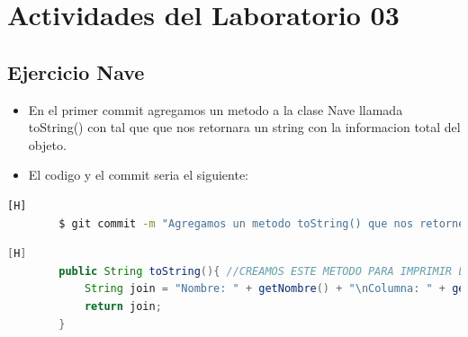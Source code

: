 \documentclass{article}
\begin{document}
	\section{Actividades del Laboratorio 03}
	
	\subsection{Ejercicio Nave}
	\begin{itemize}	
		\item En el primer commit agregamos un metodo a la clase Nave llamada toString() con tal que que nos retornara un string con la informacion total del objeto. 
		\item El codigo y el commit seria el siguiente:
	\end{itemize}	
	\begin{lstlisting}[language=bash,caption={Commit}][H]
		$ git commit -m "Agregamos un metodo toString() que nos retorne un string para que despues podamos imprimir este string que serian los datos del objeto"
	\end{lstlisting}	
	\begin{lstlisting}[language=java,caption={Las lineas de codigos del metodo creado:}][H]
        public String toString(){ //CREAMOS ESTE METODO PARA IMPRIMIR LOS DATOS DEl OBJETO
            String join = "Nombre: " + getNombre() + "\nColumna: " + getColumna() + "\nFila: " + getFila() + "\nEstado: " + getEstado() + "\nPuntos: " + getPuntos();
            return join;
        }
	\end{lstlisting}
\end{document}
